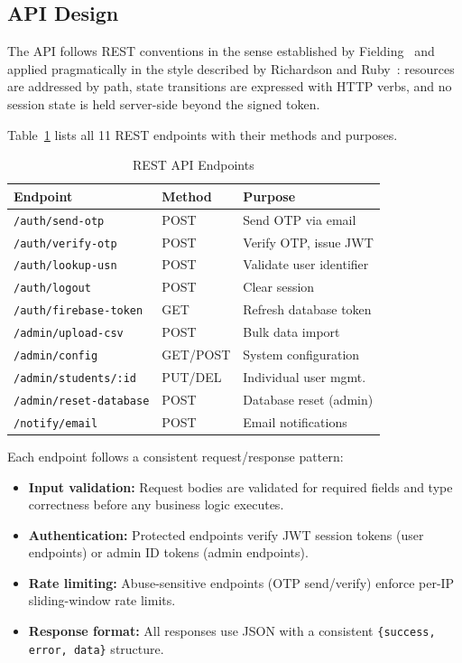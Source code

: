 \documentclass[11pt,a4paper]{article}
\theoremstyle{plain}
\theoremstyle{definition}
\theoremstyle{remark}
\begin{document}
\subsection{API Design}

The API follows REST conventions in the sense established by Fielding~\cite{fielding2000} and applied pragmatically in the style described by Richardson and Ruby~\cite{richardson2007}: resources are addressed by path, state transitions are expressed with HTTP verbs, and no session state is held server-side beyond the signed token.

Table~\ref{tab:endpoints} lists all 11 REST endpoints with their methods and purposes.

\begin{table}[htbp]
\centering
\caption{REST API Endpoints}
\label{tab:endpoints}
\small
\renewcommand{\arraystretch}{1.15}
\begin{tabular}{@{}lll@{}}
\toprule
\textbf{Endpoint} & \textbf{Method} & \textbf{Purpose} \\
\midrule
\texttt{/auth/send-otp} & POST & Send OTP via email \\
\texttt{/auth/verify-otp} & POST & Verify OTP, issue JWT \\
\texttt{/auth/lookup-usn} & POST & Validate user identifier \\
\texttt{/auth/logout} & POST & Clear session \\
\texttt{/auth/firebase-token} & GET & Refresh database token \\
\texttt{/admin/upload-csv} & POST & Bulk data import \\
\texttt{/admin/config} & GET/POST & System configuration \\
\texttt{/admin/students/:id} & PUT/DEL & Individual user mgmt. \\
\texttt{/admin/reset-database} & POST & Database reset (admin) \\
\texttt{/notify/email} & POST & Email notifications \\
\bottomrule
\end{tabular}
\end{table}

Each endpoint follows a consistent request/response pattern:
\begin{itemize}[noitemsep,topsep=3pt]
    \item \textbf{Input validation:} Request bodies are validated for required fields and type correctness before any business logic executes.
    \item \textbf{Authentication:} Protected endpoints verify JWT session tokens (user endpoints) or admin ID tokens (admin endpoints).
    \item \textbf{Rate limiting:} Abuse-sensitive endpoints (OTP send/verify) enforce per-IP sliding-window rate limits.
    \item \textbf{Response format:} All responses use JSON with a consistent \texttt{\{success, error, data\}} structure.
\end{itemize}
\end{document}

